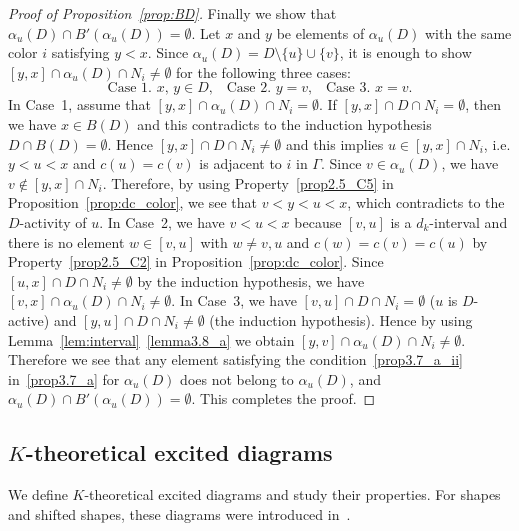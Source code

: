 \begin{proof}[Proof of Proposition~\ref{prop:BD}]
Finally we show that $\alpha_u(D) \cap B'(\alpha_u(D)) = \emptyset$.
Let $x$ and $y$ be elements of $\alpha_u(D)$ with the same color $i$ satisfying $y<x$.
Since $\alpha_u(D) = D \setminus \{ u \} \cup \{ v\}$, it is enough to 
show 
$[y,x] \cap \alpha_u(D) \cap N_i \neq \emptyset$
for the following three cases:
$$
\text{Case~1. $x$, $y \in D$,}
\quad
\text{Case~2. $y = v$,}
\quad
\text{Case~3. $x = v$.}
$$
In Case~1, assume that $[y,x] \cap \alpha_u(D) \cap N_i = \emptyset$.
If $[y,x] \cap D \cap N_i = \emptyset$, then we have $x \in B(D)$ 
and this contradicts to the induction hypothesis $D \cap B(D) = \emptyset$.
Hence $[y,x] \cap D \cap N_i \neq \emptyset$ 
and this implies $u \in [y,x] \cap N_i$, 
i.e. $y < u < x$ and $c(u) = c(v)$ is adjacent to $i$ in $\Gamma$.
Since $v \in \alpha_u(D)$, we have $v \not\in [y,x] \cap N_i$.
Therefore, by using Property~\ref{prop2.5_C5} in Proposition~\ref{prop:dc_color}, we see that 
$v < y < u < x$, which contradicts to the $D$-activity of $u$.
In Case~2, we have $v < u < x$ because $[v,u]$ is a $d_k$-interval 
and there is no element $w \in [v,u]$ with $w \neq v, u$ and $c(w) = c(v) = c(u)$ 
by Property~\ref{prop2.5_C2} in Proposition~\ref{prop:dc_color}.
Since $[u,x] \cap D \cap N_i \neq \emptyset$ by the induction hypothesis, 
we have $[v,x] \cap \alpha_u(D) \cap N_i \neq \emptyset$.
In Case~3, we have $[v,u] \cap D \cap N_i = \emptyset$ ($u$ is $D$-active) 
and $[y,u] \cap D \cap N_i \neq \emptyset$ (the induction hypothesis).
Hence by using Lemma~\ref{lem:interval}~\ref{lemma3.8_a} we obtain $[y,v] \cap \alpha_u(D) \cap N_i \neq \emptyset$.
Therefore we see that any element satisfying the condition~\ref{prop3.7_a_ii} in~\ref{prop3.7_a} for $\alpha_u(D)$ 
does not belong to $\alpha_u(D)$, and $\alpha_u(D) \cap B'(\alpha_u(D)) = \emptyset$.
This completes the proof.
\end{proof}

\subsection{%
\texorpdfstring{$K$}{K}-theoretical excited diagrams
}

We define $K$-theoretical excited diagrams and study their properties.
For shapes and shifted shapes, these diagrams were introduced in~\cite{GK}.

